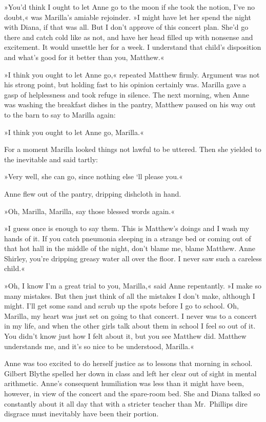 »You'd think I ought to let Anne go to the moon if she took the notion, I've no doubt,« was Marilla's amiable rejoinder. »I might have let her spend the night with Diana, if that was all. But I don't approve of this concert plan. She'd go there and catch cold like as not, and have her head filled up with nonsense and excitement. It would unsettle her for a week. I understand that child's disposition and what's good for it better than you, Matthew.«

»I think you ought to let Anne go,« repeated Matthew firmly. Argument was not his strong point, but holding fast to his opinion certainly was. Marilla gave a gasp of helplessness and took refuge in silence. The next morning, when Anne was washing the breakfast dishes in the pantry, Matthew paused on his way out to the barn to say to Marilla again:

»I think you ought to let Anne go, Marilla.«

For a moment Marilla looked things not lawful to be uttered. Then she yielded to the inevitable and said tartly:

»Very well, she can go, since nothing else ‘ll please you.«

Anne flew out of the pantry, dripping dishcloth in hand.

»Oh, Marilla, Marilla, say those blessed words again.«

»I guess once is enough to say them. This is Matthew's doings and I wash my hands of it. If you catch pneumonia sleeping in a strange bed or coming out of that hot hall in the middle of the night, don't blame me, blame Matthew. Anne Shirley, you're dripping greasy water all over the floor. I never saw such a careless child.«

»Oh, I know I'm a great trial to you, Marilla,« said Anne repentantly. »I make so many mistakes. But then just think of all the mistakes I don't make, although I might. I'll get some sand and scrub up the spots before I go to school. Oh, Marilla, my heart was just set on going to that concert. I never was to a concert in my life, and when the other girls talk about them in school I feel so out of it. You didn't know just how I felt about it, but you see Matthew did. Matthew understands me, and it's so nice to be understood, Marilla.«

Anne was too excited to do herself justice as to lessons that morning in school. Gilbert Blythe spelled her down in class and left her clear out of sight in mental arithmetic. Anne's consequent humiliation was less than it might have been, however, in view of the concert and the spare-room bed. She and Diana talked so constantly about it all day that with a stricter teacher than Mr.~Phillips dire disgrace must inevitably have been their portion.

